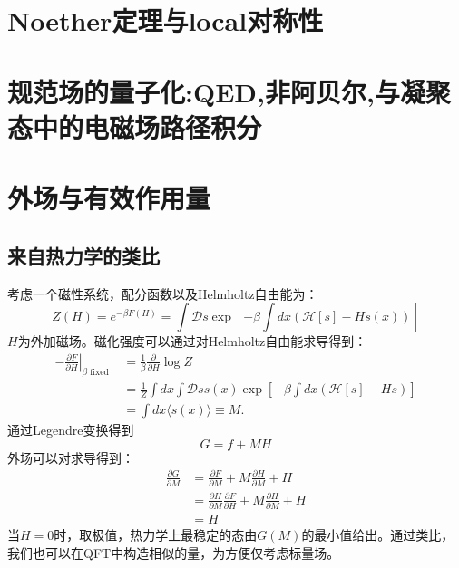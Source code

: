 \documentclass{article}
\begin{document}
\section{Noether定理与local对称性}
  \section{规范场的量子化:QED,非阿贝尔,与凝聚态中的电磁场路径积分}

\section{外场与有效作用量}
\subsection{来自热力学的类比}
考虑一个磁性系统，配分函数以及Helmholtz自由能为：
\begin{equation}
  Z(H)=e^{-\beta F(H)}=\int \mathcal{D} s \exp \left[-\beta \int d x(\mathcal{H}[s]-H s(x))\right]
\end{equation}
$ H $为外加磁场。磁化强度可以通过对Helmholtz自由能求导得到：
\begin{equation*}
  \begin{aligned}
    -\left.\frac{\partial F}{\partial H}\right|_{\beta \text { fixed }} & =\frac{1}{\beta} \frac{\partial}{\partial H} \log Z \\
    & =\frac{1}{Z} \int d x \int \mathcal{D} s s(x) \exp \left[-\beta \int d x(\mathcal{H}[s]-H s)\right] \\
    & =\int d x\langle s(x)\rangle \equiv M .
    \end{aligned}
\end{equation*}
\gf 通过Legendre变换得到
\begin{equation*}
  G=f+MH
\end{equation*}
外场可以对\gf 求导得到：
\begin{equation}
  \begin{aligned}
    \frac{\partial G}{\partial M} & =\frac{\partial F}{\partial M}+M \frac{\partial H}{\partial M}+H \\
    & =\frac{\partial H}{\partial M} \frac{\partial F}{\partial H}+M \frac{\partial H}{\partial M}+H \\
    & =H
    \end{aligned}
\end{equation}
当$ H=0 $时，\gf 取极值，热力学上最稳定的态由$ G(M) $的最小值给出。通过类比，我们也可以在QFT中构造相似的量，为方便仅考虑标量场。
\end{document}
